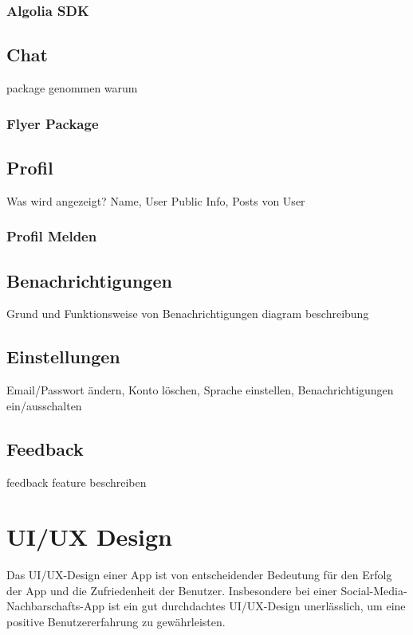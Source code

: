 \subsubsection{Algolia SDK}


\subsection{Chat}
package genommen warum
\subsubsection{Flyer Package}

\subsection{Profil}
\author{Sandin Habibovic}
Was wird angezeigt?
Name, User Public Info, Posts von User

\subsubsection{Profil Melden}
\author{Sandin Habibovic}

\subsection{Benachrichtigungen}
\author{Sandin Habibovic}
Grund und Funktionsweise von Benachrichtigungen
diagram beschreibung
\subsection{Einstellungen}
\author{Sandin Habibovic}
Email/Passwort ändern, Konto löschen, Sprache einstellen, Benachrichtigungen ein/ausschalten
\subsection{Feedback}
\author{Martin Hausleitner}
feedback feature beschreiben


\section{UI/UX Design}
Das UI/UX-Design einer App ist von entscheidender Bedeutung für den Erfolg der App und die Zufriedenheit der Benutzer. Insbesondere bei einer Social-Media-Nachbarschafts-App ist ein gut durchdachtes UI/UX-Design unerlässlich, um eine positive Benutzererfahrung zu gewährleisten.

